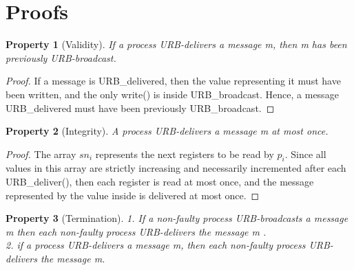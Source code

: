 \documentclass{scrartcl}
\newtheorem{prop}{Property}
\begin{document}
\section{Proofs}
\begin{prop}[Validity]
If a process URB-delivers a message m, then m has been previously URB-broadcast.
\end{prop}

\begin{proof}
If a message is URB\_delivered, then the value representing it must have been written, and the only write() is inside URB\_broadcast. Hence, a message URB\_delivered must have been previously URB\_broadcast.
\end{proof}


\begin{prop}[Integrity]
A process URB-delivers a message m at most once.
\end{prop}

\begin{proof}
The array $sn_i$ represents the next registers to be read by $p_i$. Since all values in this array are strictly increasing and necessarily incremented after each URB\_deliver(), then each register is read at most once, and the message represented by the value inside is delivered at most once.
\end{proof}


\begin{prop}[Termination]
1. If a non-faulty process URB-broadcasts a message m then each non-faulty process URB-delivers the message m . \\
2. if a process URB-delivers a message m, then each non-faulty process URB-delivers the message m.
\end{prop}
\end{document}
